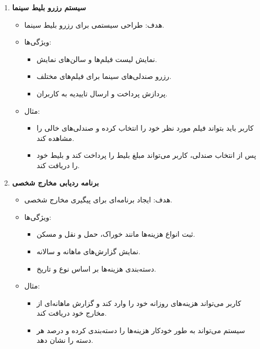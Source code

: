 \documentclass[b5paper,12pt]{article}
\begin{document}
\begin{enumerate}
			\item \textbf{سیستم رزرو بلیط سینما}
			\begin{itemize}
				\item هدف: طراحی سیستمی برای رزرو بلیط سینما.
				\item ویژگی‌ها:
				\begin{itemize}
					\item نمایش لیست فیلم‌ها و سالن‌های نمایش.
					\item رزرو صندلی‌های سینما برای فیلم‌های مختلف.
					\item پردازش پرداخت و ارسال تاییدیه به کاربران.
				\end{itemize}
				\item مثال:
				\begin{itemize}
					\item کاربر باید بتواند فیلم مورد نظر خود را انتخاب کرده و صندلی‌های خالی را مشاهده کند.
					\item پس از انتخاب صندلی، کاربر می‌تواند مبلغ بلیط را پرداخت کند و بلیط خود را دریافت کند.
				\end{itemize}
			\end{itemize}
			
			\item \textbf{برنامه ردیابی مخارج شخصی}
			\begin{itemize}
				\item هدف: ایجاد برنامه‌ای برای پیگیری مخارج شخصی.
				\item ویژگی‌ها:
				\begin{itemize}
					\item ثبت انواع هزینه‌ها مانند خوراک، حمل و نقل و مسکن.
					\item نمایش گزارش‌های ماهانه و سالانه.
					\item دسته‌بندی هزینه‌ها بر اساس نوع و تاریخ.
				\end{itemize}
				\item مثال:
				\begin{itemize}
					\item کاربر می‌تواند هزینه‌های روزانه خود را وارد کند و گزارش ماهانه‌ای از مخارج خود دریافت کند.
					\item سیستم می‌تواند به طور خودکار هزینه‌ها را دسته‌بندی کرده و درصد هر دسته را نشان دهد.
				\end{itemize}
			\end{itemize}
			

\end{enumerate}
\end{document}

